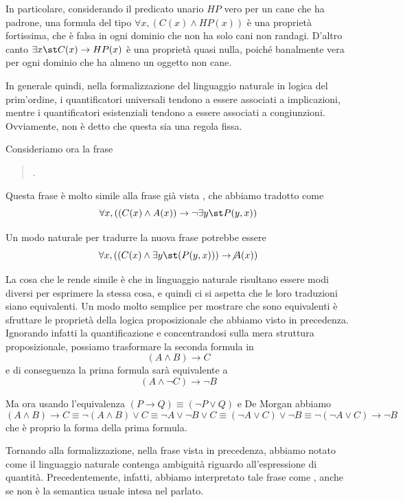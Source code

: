 In particolare, considerando il predicato unario \(HP\) vero per un cane che ha padrone, una formula del tipo \(\forall x, (C(x) \land HP(x))\) è una proprietà fortissima, che è falsa in ogni dominio che non ha solo cani non randagi. D'altro canto \(\exists x\st C(x) \to HP(x)\) è una proprietà quasi nulla, poiché banalmente vera per ogni dominio che ha almeno un oggetto non cane.

In generale quindi, nella formalizzazione del linguaggio naturale in logica del prim'ordine, i quantificatori universali tendono a essere associati a implicazioni, mentre i quantificatori esistenziali tendono a essere associati a congiunzioni. Ovviamente, non è detto che questa sia una regola fissa.

Consideriamo ora la frase 
\begin{quote}
  .
\end{quote}

Questa frase è molto simile alla frase già vista , che abbiamo tradotto come
\[\forall x, ((C(x) \land A(x)) \to \neg\exists y\st P(y,x))\]

Un modo naturale per tradurre la nuova frase potrebbe essere
\[\forall x, ((C(x) \land \exists y\st( P(y,x) )) \to \not A(x))\]

La cosa che le rende simile è che in linguaggio naturale risultano essere modi diversi per esprimere la stessa cosa, e quindi ci si aspetta che le loro traduzioni siano equivalenti. Un modo molto semplice per mostrare che sono equivalenti è sfruttare le proprietà della logica proposizionale che abbiamo visto in precedenza. Ignorando infatti la quantificazione e concentrandosi sulla mera struttura proposizionale, possiamo trasformare la seconda formula in
\[(A \land B )\to C\]
e di conseguenza la prima formula sarà equivalente a
\[(A \land \neg C) \to \neg B\]

Ma ora usando l'equivalenza \((P \to Q) \equiv (\neg P \lor Q)\) e De Morgan abbiamo
\[(A \land B )\to C\equiv \neg (A \land B) \lor C\equiv \neg A \lor \neg B \lor C \equiv (\neg A \lor C) \lor \neg B \equiv \neg (\neg A \lor C) \to \neg B \]
che è proprio la forma della prima formula.

Tornando alla formalizzazione, nella frase vista in precedenza,  abbiamo notato come il linguaggio naturale contenga ambiguità riguardo all'espressione di quantità. Precedentemente, infatti, abbiamo interpretato tale frase come , anche se non è la semantica usuale intesa nel parlato.

